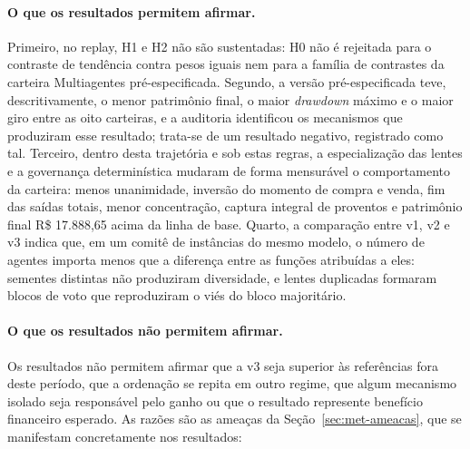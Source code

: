 \documentclass{eic-bcc-tcc}
\begin{document}
\paragraph{O que os resultados permitem afirmar.} Primeiro, no replay, H1 e H2 não são sustentadas: H0 não é rejeitada para o contraste de tendência contra pesos iguais nem para a família de contrastes da carteira Multiagentes pré-especificada. Segundo, a versão pré-especificada teve, descritivamente, o menor patrimônio final, o maior \textit{drawdown} máximo e o maior giro entre as oito carteiras, e a auditoria identificou os mecanismos que produziram esse resultado; trata-se de um resultado negativo, registrado como tal. Terceiro, dentro desta trajetória e sob estas regras, a especialização das lentes e a governança determinística mudaram de forma mensurável o comportamento da carteira: menos unanimidade, inversão do momento de compra e venda, fim das saídas totais, menor concentração, captura integral de proventos e patrimônio final R\$ 17.888,65 acima da linha de base. Quarto, a comparação entre v1, v2 e v3 indica que, em um comitê de instâncias do mesmo modelo, o número de agentes importa menos que a diferença entre as funções atribuídas a eles: sementes distintas não produziram diversidade, e lentes duplicadas formaram blocos de voto que reproduziram o viés do bloco majoritário.

\paragraph{O que os resultados não permitem afirmar.} Os resultados não permitem afirmar que a v3 seja superior às referências fora deste período, que a ordenação se repita em outro regime, que algum mecanismo isolado seja responsável pelo ganho ou que o resultado represente benefício financeiro esperado. As razões são as ameaças da Seção~\ref{sec:met-ameacas}, que se manifestam concretamente nos resultados:
\end{document}
